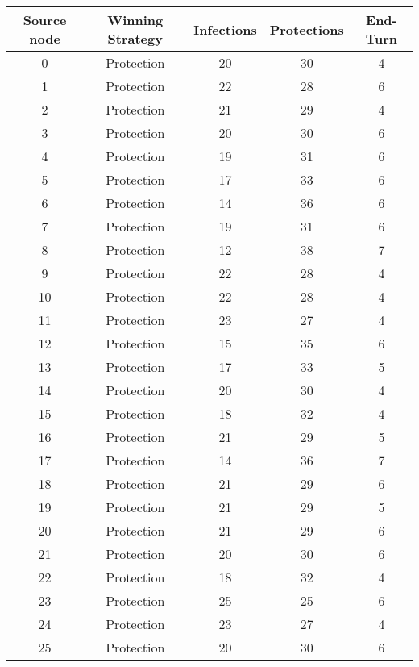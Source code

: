 \documentclass[results.tex]{subfiles}
\begin{document}
\begin{center}
  \begin{tabular}{| c || c | c | c | c |}
    \hline
    {\bfseries Source node} & {\bfseries Winning Strategy} & {\bfseries Infections} & {\bfseries Protections} & {\bfseries End-Turn} \\  %
    \hline\hline
    0 & Protection & 20 & 30 & 4 \\ 
    \hline
    1 & Protection & 22 & 28 & 6 \\ 
    \hline
    2 & Protection & 21 & 29 & 4 \\ 
    \hline
    3 & Protection & 20 & 30 & 6 \\ 
    \hline
    4 & Protection & 19 & 31 & 6 \\ 
    \hline
    5 & Protection & 17 & 33 & 6 \\ 
    \hline
    6 & Protection & 14 & 36 & 6 \\ 
    \hline
    7 & Protection & 19 & 31 & 6 \\ 
    \hline
    8 & Protection & 12 & 38 & 7 \\ 
    \hline
    9 & Protection & 22 & 28 & 4 \\ 
    \hline
    10 & Protection & 22 & 28 & 4 \\ 
    \hline
    11 & Protection & 23 & 27 & 4 \\ 
    \hline
    12 & Protection & 15 & 35 & 6 \\ 
    \hline
    13 & Protection & 17 & 33 & 5 \\ 
    \hline
    14 & Protection & 20 & 30 & 4 \\ 
    \hline
    15 & Protection & 18 & 32 & 4 \\ 
    \hline
    16 & Protection & 21 & 29 & 5 \\ 
    \hline
    17 & Protection & 14 & 36 & 7 \\ 
    \hline
    18 & Protection & 21 & 29 & 6 \\ 
    \hline
    19 & Protection & 21 & 29 & 5 \\ 
    \hline
    20 & Protection & 21 & 29 & 6 \\ 
    \hline
    21 & Protection & 20 & 30 & 6 \\ 
    \hline
    22 & Protection & 18 & 32 & 4 \\ 
    \hline
    23 & Protection & 25 & 25 & 6 \\ 
    \hline
    24 & Protection & 23 & 27 & 4 \\ 
    \hline
    25 & Protection & 20 & 30 & 6 \\ 

\end{tabular}
\end{center}
\end{document}
